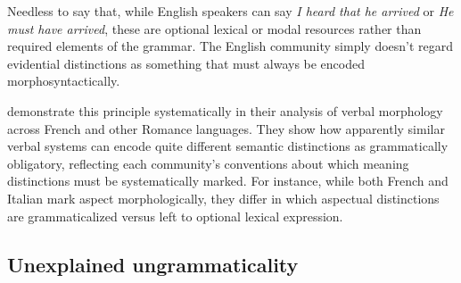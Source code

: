 \documentclass[12pt,letterpaper]{article}
\begin{document}
Needless to say that, while English speakers can say \textit{I heard that he arrived} or \textit{He must have arrived}, these are optional lexical or modal resources rather than required elements of the grammar. The English community simply doesn't regard evidential distinctions as something that must always be encoded morphosyntactically.

\textcite{kilani2005} demonstrate this principle systematically in their analysis of verbal morphology across French and other Romance languages. They show how apparently similar verbal systems can encode quite different semantic distinctions as grammatically obligatory, reflecting each community's conventions about which meaning distinctions must be systematically marked. For instance, while both French and Italian mark aspect morphologically, they differ in which aspectual distinctions are grammaticalized versus left to optional lexical expression.

\subsection{Unexplained ungrammaticality}\label{sec:systematic-blocking}
\end{document}
